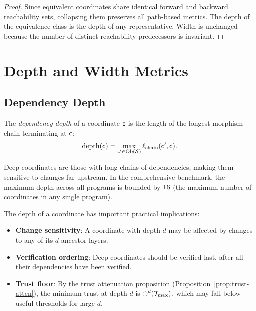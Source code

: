 \documentclass[11pt]{article}
\newcommand{\DepDepth}{\mathrm{depth}}
\newcommand{\ChainLen}{\ell_{\mathrm{chain}}}
\begin{document}
\begin{proof}
Since equivalent coordinates share identical forward and backward
reachability sets, collapsing them preserves all path-based metrics.
The depth of the equivalence class is the depth of any representative.
Width is unchanged because the number of distinct reachability predecessors
is invariant.
\end{proof}

\section{Depth and Width Metrics}\label{sec:metrics}

\subsection{Dependency Depth}

\begin{definition}\label{def:dep-depth}
The \emph{dependency depth} of a coordinate $\mathsf{c}$ is the length of the
longest morphism chain terminating at $\mathsf{c}$:
\[
  \DepDepth(\coord) = \max_{\coord' \in \Ob(\Site)} \ChainLen(\coord', \coord).
\]
\end{definition}

Deep coordinates are those with long chains of dependencies, making them
sensitive to changes far upstream.  In the comprehensive benchmark, the
maximum depth across all programs is bounded by $16$ (the
maximum number of coordinates in any single program).

The depth of a coordinate has important practical implications:
\begin{itemize}[noitemsep]
  \item \textbf{Change sensitivity}: A coordinate with depth $d$ may be
        affected by changes to any of its $d$ ancestor layers.
  \item \textbf{Verification ordering}: Deep coordinates should be
        verified last, after all their dependencies have been verified.
  \item \textbf{Trust floor}: By the trust attenuation proposition
        (Proposition~\ref{prop:trust-atten}), the minimum trust at depth
        $d$ is $\ominus^d(\mathcal{T}_{\max})$, which may fall below useful
        thresholds for large $d$.
\end{itemize}
\end{document}

